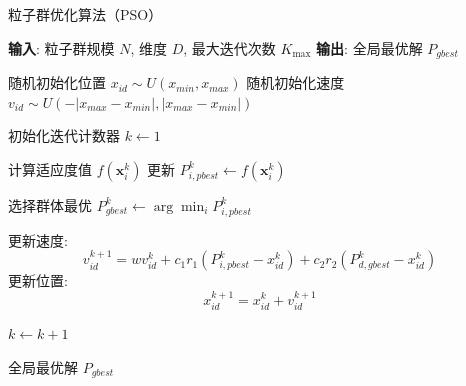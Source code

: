 \documentclass[12pt,a4paper]{article}
\begin{document}
\begin{algorithm}
\caption{粒子群优化算法（PSO）}
\label{alg:pso}
\begin{algorithmic}[1]
\State \textbf{输入}: 粒子群规模 $N$, 维度 $D$, 最大迭代次数 $K_{\max}$
\State \textbf{输出}: 全局最优解 $P_{gbest}$

        \State 随机初始化位置 $x_{id} \sim U(x_{min}, x_{max})$
        \State 随机初始化速度 $v_{id} \sim U(-|x_{max}-x_{min}|, |x_{max}-x_{min}|)$
    \EndFor
\EndFor

\State 初始化迭代计数器 $k \gets 1$

\Repeat
        \State 计算适应度值 $f(\mathbf{x}_i^k)$
            \State 更新 $P_{i,pbest}^k \gets f(\mathbf{x}_i^k)$
        \EndIf
    \EndFor
    
    \State 选择群体最优 $P_{gbest}^k \gets \arg\min_{i} P_{i,pbest}^k$
    
            \State 更新速度:
            \begin{equation*}
                v_{id}^{k+1} = w v_{id}^k + c_1 r_1 (P_{i,pbest}^k - x_{id}^k) + c_2 r_2 (P_{d,gbest}^k - x_{id}^k)
            \end{equation*}
            \State 更新位置:
            \begin{equation*}
                x_{id}^{k+1} = x_{id}^k + v_{id}^{k+1}
            \end{equation*}
        \EndFor
    \EndFor
    
    \State $k \gets k + 1$

\State \Return 全局最优解 $P_{gbest}$
\end{algorithmic}
\end{algorithm}
\end{document}
